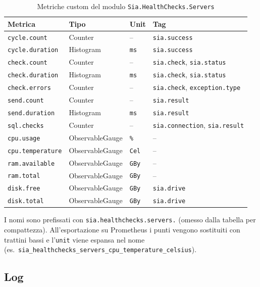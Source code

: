 \begin{table}[h]
\centering
\caption{Metriche custom del modulo \texttt{Sia.HealthChecks.Servers}}
\label{tab:metrics-healthchecks}
\begin{tabularx}{\textwidth}{|l|l|l|X|}
\hline
\textbf{Metrica} & \textbf{Tipo} & \textbf{Unit} & \textbf{Tag} \\
\hline
\texttt{cycle.count} & Counter & -- & \texttt{sia.success} \\
\hline
\texttt{cycle.duration} & Histogram & \texttt{ms} & \texttt{sia.success} \\
\hline
\texttt{check.count} & Counter & -- & \texttt{sia.check}, \texttt{sia.status} \\
\hline
\texttt{check.duration} & Histogram & \texttt{ms} & \texttt{sia.check}, \texttt{sia.status} \\
\hline
\texttt{check.errors} & Counter & -- & \texttt{sia.check}, \texttt{exception.type} \\
\hline
\texttt{send.count} & Counter & -- & \texttt{sia.result} \\
\hline
\texttt{send.duration} & Histogram & \texttt{ms} & \texttt{sia.result} \\
\hline
\texttt{sql.checks} & Counter & -- & \texttt{sia.connection}, \texttt{sia.result} \\
\hline
\texttt{cpu.usage} & ObservableGauge & \texttt{\%} & -- \\
\hline
\texttt{cpu.temperature} & ObservableGauge & \texttt{Cel} & -- \\
\hline
\texttt{ram.available} & ObservableGauge & \texttt{GBy} & -- \\
\hline
\texttt{ram.total} & ObservableGauge & \texttt{GBy} & -- \\
\hline
\texttt{disk.free} & ObservableGauge & \texttt{GBy} & \texttt{sia.drive} \\
\hline
\texttt{disk.total} & ObservableGauge & \texttt{GBy} & \texttt{sia.drive} \\
\hline
\end{tabularx}
\end{table}

I nomi sono prefissati con \texttt{sia.healthchecks.servers.} (omesso dalla tabella per
compattezza). All'esportazione su Prometheus i punti vengono sostituiti con trattini bassi
e l'\texttt{unit} viene espansa nel nome (es.\ \texttt{sia\_healthchecks\_servers\_cpu\_temperature\_celsius}).

\subsection{Log}

